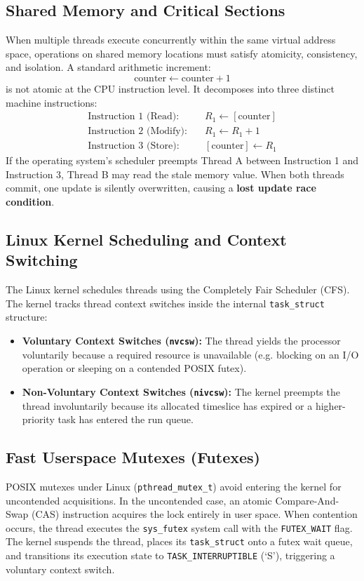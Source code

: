\documentclass[11pt,a4paper]{article}
\begin{document}
\subsection{Shared Memory and Critical Sections}
When multiple threads execute concurrently within the same virtual address space, operations on shared memory locations must satisfy atomicity, consistency, and isolation. A standard arithmetic increment:
\begin{equation}
\text{counter} \leftarrow \text{counter} + 1
\end{equation}
is not atomic at the CPU instruction level. It decomposes into three distinct machine instructions:
\begin{align}
\text{Instruction 1 (Read):} &\quad R_1 \leftarrow [\text{counter}] \nonumber \\
\text{Instruction 2 (Modify):} &\quad R_1 \leftarrow R_1 + 1 \nonumber \\
\text{Instruction 3 (Store):} &\quad [\text{counter}] \leftarrow R_1 \nonumber
\end{align}
If the operating system's scheduler preempts Thread A between Instruction 1 and Instruction 3, Thread B may read the stale memory value. When both threads commit, one update is silently overwritten, causing a \textbf{lost update race condition}.

\subsection{Linux Kernel Scheduling and Context Switching}
The Linux kernel schedules threads using the Completely Fair Scheduler (CFS). The kernel tracks thread context switches inside the internal \texttt{task\_struct} structure:
\begin{itemize}
    \item \textbf{Voluntary Context Switches (\texttt{nvcsw}):} The thread yields the processor voluntarily because a required resource is unavailable (e.g. blocking on an I/O operation or sleeping on a contended POSIX futex).
    \item \textbf{Non-Voluntary Context Switches (\texttt{nivcsw}):} The kernel preempts the thread involuntarily because its allocated timeslice has expired or a higher-priority task has entered the run queue.
\end{itemize}

\subsection{Fast Userspace Mutexes (Futexes)}
POSIX mutexes under Linux (\texttt{pthread\_mutex\_t}) avoid entering the kernel for uncontended acquisitions. In the uncontended case, an atomic Compare-And-Swap (CAS) instruction acquires the lock entirely in user space. When contention occurs, the thread executes the \texttt{sys\_futex} system call with the \texttt{FUTEX\_WAIT} flag. The kernel suspends the thread, places its \texttt{task\_struct} onto a futex wait queue, and transitions its execution state to \texttt{TASK\_INTERRUPTIBLE} (`S'), triggering a voluntary context switch.
\end{document}
